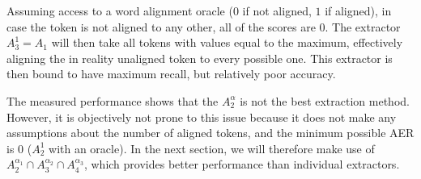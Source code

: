 Assuming access to a word alignment oracle ($0$ if not aligned, $1$ if aligned), in case the token is not aligned to any other, all of the scores are $0$. The extractor $A_3^1 = A_1$ will then take all tokens with values equal to the maximum, effectively aligning the in reality unaligned token to every possible one. This extractor is then bound to have maximum recall, but relatively poor accuracy.

The measured performance shows that the $A_2^{\alpha}$ is not the best extraction method. However, it is objectively not prone to this issue because it does not make any assumptions about the number of aligned tokens, and the minimum possible AER is 0 ($A_2^1$ with an oracle). In the next section, we will therefore make use of $A_2^{\alpha_1} \cap A_3^{\alpha_2} \cap A_4^{\alpha_3}$, which provides better performance than individual extractors.